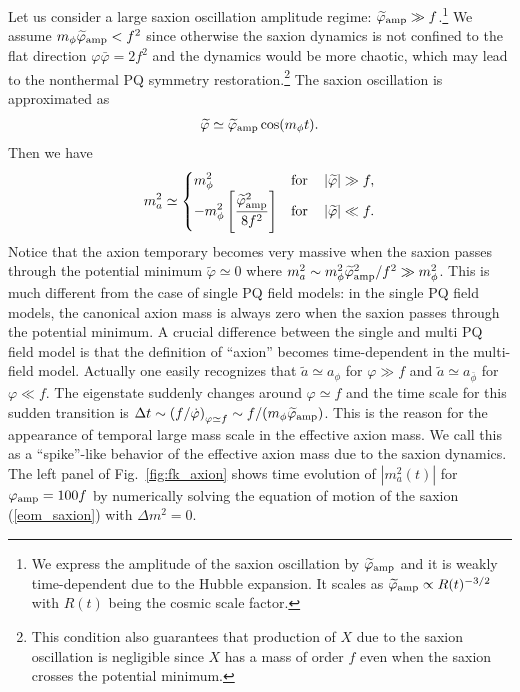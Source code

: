 \documentclass[12pt, a4paper]{article}
\begin{document}
Let us consider a large saxion oscillation amplitude regime: $\widetilde \varphi_{\rm amp} \gg f$.\footnote{
	We express the amplitude of the saxion oscillation by $\widetilde\varphi_{\rm amp}$ and it is weakly time-dependent due to the Hubble expansion.
	It scales as $\widetilde\varphi_{\rm amp} \propto R(t)^{-3/2}$ with $R(t)$ being the cosmic scale factor. 
}
We assume $m_\phi \widetilde \varphi_{\rm amp} < f^2$ 
since otherwise the saxion dynamics is not confined to the flat direction
$\varphi\bar\varphi = 2f^2$ and the dynamics would be more chaotic, 
which may lead to the nonthermal PQ symmetry restoration.\footnote{
	This condition also guarantees that production of $X$ due to the saxion oscillation is negligible since
	$X$ has a mass of order $f$ even when the saxion crosses the potential minimum.
} The saxion oscillation is approximated as
\begin{align}
	\widetilde \varphi \simeq \widetilde \varphi_{\rm amp}\cos(m_\phi t).
\end{align}
Then we have
\begin{align}
	m_{a}^2 \simeq \begin{cases}
	\displaystyle m_\phi^2 & {\rm for}~~~\left\lvert \widetilde \varphi \right\rvert \gg f, \\
	\displaystyle -m_\phi^2\left[\frac{ \widetilde \varphi_{\rm amp}^2}{8f^2}\right] 
	& {\rm for}~~~\left\lvert \widetilde \varphi \right\rvert \ll f.
	\end{cases}
	\label{ma_spike}
\end{align}
Notice that the axion temporary becomes very massive when the saxion passes through the potential minimum $\widetilde\varphi \simeq 0$
where $m_{a}^2 \sim m_\phi^2 \widetilde \varphi_{\rm amp}^2 / f^2 \gg m_\phi^2$.
This is much different from the case of single PQ field models: in the single PQ field models,
the canonical axion mass is always zero when the saxion passes through the potential minimum.
A crucial difference between the single and multi PQ field model is that the definition of ``axion'' becomes time-dependent in the multi-field model.
Actually one easily recognizes that $\tilde a \simeq a_\phi$ for $\varphi \gg f$ and $\tilde a \simeq a_{\bar\phi}$ for $\varphi \ll f$.
The eigenstate suddenly changes around $\varphi \simeq f$ and the time scale for this sudden transition is
$\Delta t \sim \left(f / \dot\varphi\right)_{\varphi\simeq f} \sim f/(m_\phi \widetilde\varphi_{\rm amp})$.
This is the reason for the appearance of temporal large mass scale in the effective axion mass.
We call this as a ``spike''-like behavior of the effective axion mass due to the saxion dynamics.
The left panel of Fig.~\ref{fig:fk_axion} shows time evolution of $|m_a^2(t)|$ for $\varphi_{\rm amp} = 100f$
by numerically solving the equation of motion of the saxion (\ref{eom_saxion}) with $\Delta m^2 = 0$.
\end{document}
